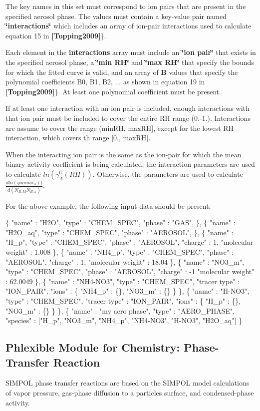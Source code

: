 The key names in this set must correspond to ion pairs that are present in the specified aerosol phase. The values must contain a key-\/value pair named {\bfseries \char`\"{}interactions\char`\"{}} which includes an array of ion-\/pair interactions used to calculate equation 15 in {\bfseries [Topping2009]}\}.

Each element in the {\bfseries interactions} array must include an {\bfseries \char`\"{}ion pair\char`\"{}} that exists in the specified aerosol phase, a {\bfseries \char`\"{}min R\+H\char`\"{}} and {\bfseries \char`\"{}max R\+H\char`\"{}} that specify the bounds for which the fitted curve is valid, and an array of {\bfseries B} values that specify the polynomial coefficients B0, B1, B2, ... as shown in equation 19 in {\bfseries [Topping2009]}\}. At least one polynomial coefficient must be present.

If at least one interaction with an ion pair is included, enough interactions with that ion pair must be included to cover the entire RH range (0.-\/1.). Interactions are assume to cover the range (min\+RH, max\+RH\mbox{]}, except for the lowest RH interaction, which covers th range \mbox{[}0., max\+RH\mbox{]}.

When the interacting ion pair is the same as the ion-\/pair for which the mean binary activity coefficient is being calculated, the interaction parameters are used to calculate $ln(\gamma_A^0(RH))$. Otherwise, the parameters are used to calculate $\frac{dln(gamma_A))}{d(N_{B,M}N_{B,x})}$.

For the above example, the following input data should be present\+: 
\begin{DoxyCode}
\{
  "name" : "H2O",
  "type" : "CHEM\_SPEC",
  "phase" : "GAS",
\},  
\{
  "name" : "H2O\_aq",
  "type" : "CHEM\_SPEC",
  "phase" : "AEROSOL",
\},  
\{
  "name" : "H\_p",
  "type" : "CHEM\_SPEC",
  "phase" : "AEROSOL",
  "charge" : 1,
  "molecular weight" : 1.008
\},
\{
  "name" : "NH4\_p",
  "type" : "CHEM\_SPEC",
  "phase" : "AEROSOL",
  "charge" : 1,
  "molecular weight" : 18.04
\},
\{
  "name" : "NO3\_m",
  "type" : "CHEM\_SPEC",
  "phase" : "AEROSOL",
  "charge" : -1
  "molecular weight" : 62.0049
\},
\{
  "name" : "NH4-NO3",
  "type" : "CHEM\_SPEC",
  "tracer type" : "ION\_PAIR",
  "ions" : \{
    "NH4\_p" : \{\},
    "NO3\_m" : \{\}
  \}
\},
\{
  "name" : "H-NO3",
  "type" : "CHEM\_SPEC",
  "tracer type" : "ION\_PAIR",
  "ions" : \{
    "H\_p" : \{\},
    "NO3\_m" : \{\}
  \}
\},
\{
  "name" : "my aero phase",
  "type" : "AERO\_PHASE",
  "species" : ["H\_p", "NO3\_m", "NH4\_p", "NH4-NO3", "H-NO3", "H2O\_aq"]
\}
\end{DoxyCode}
\hypertarget{phlex_rxn_SIMPOL_phase_transfer}{}\subsection{Phlexible Module for Chemistry\+: Phase-\/\+Transfer Reaction}\label{phlex_rxn_SIMPOL_phase_transfer}
S\+I\+M\+P\+OL phase transfer reactions are based on the S\+I\+M\+P\+OL model calculations of vapor pressure, gas-\/phase diffusion to a particle\textquotesingle{}s surface, and condensed-\/phase activity.

